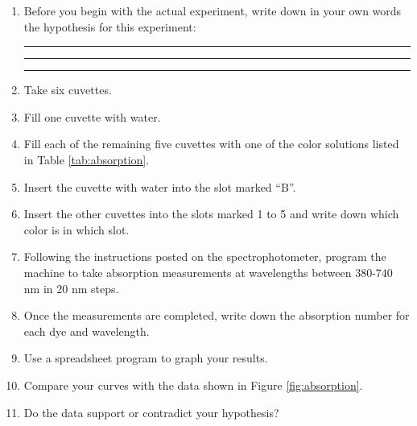 \begin{enumerate}
\def\labelenumi{\arabic{enumi}.}
\item
  Before you begin with the actual experiment, write down in your own
  words the hypothesis for this experiment:

  \begin{center}\rule{0.5\linewidth}{\linethickness}\end{center}

  \begin{center}\rule{0.5\linewidth}{\linethickness}\end{center}

  \begin{center}\rule{0.5\linewidth}{\linethickness}\end{center}
\item
  Take six cuvettes.
\item
  Fill one cuvette with water.
\item
  Fill each of the remaining five cuvettes with one of the color
  solutions listed in Table \ref{tab:absorption}.
\item
  Insert the cuvette with water into the slot marked ``B''.
\item
  Insert the other cuvettes into the slots marked 1 to 5 and write down
  which color is in which slot.
\item
  Following the instructions posted on the spectrophotometer, program
  the machine to take absorption measurements at wavelengths between
  380-740 nm in 20 nm steps.
\item
  Once the measurements are completed, write down the absorption number
  for each dye and wavelength.
\item
  Use a spreadsheet program to graph your results.
\item
  Compare your curves with the data shown in Figure
  \ref{fig:absorption}.
\item
  Do the data support or contradict your hypothesis?
\end{enumerate}

